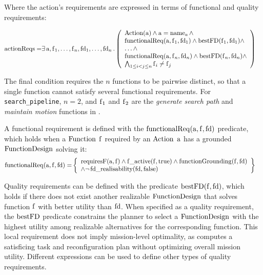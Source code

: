 Where the action's requirements are expressed in terms of functional and quality requirements:

\begin{align*}
    \operatorname{actionReqs} =& \exists \operatorname{a}, \operatorname{f}_1, \ldots{},\operatorname{f}_n,\operatorname{fd}_1,\ldots{},\operatorname{fd}_n .\left(\begin{array}{l} \operatorname{Action}(\operatorname{a}) \land \operatorname{a} = \operatorname{name}_a \land  \\
    \operatorname{functionalReq}(\operatorname{a}, \operatorname{f}_1, \operatorname{fd}_1) \land \operatorname{bestFD}(\operatorname{f}_1, \operatorname{fd}_1) \land
    \\ \ldots{} \land \\
    \operatorname{functionalReq}(\operatorname{a}, \operatorname{f}_n, \operatorname{fd}_n) \land \operatorname{bestFD}(\operatorname{f}_n, \operatorname{fd}_n) \land \\
    \bigwedge_{1 \leq i < j \leq n} \operatorname{f}_i \neq \operatorname{f}_j \\
 \end{array}\right)
\end{align*}

The final condition requires the $n$ functions to be pairwise distinct, so that a single function cannot satisfy several functional requirements. For \texttt{search\_pipeline}, $n = 2$, and $\operatorname{f}_1$ and $\operatorname{f}_2$ are the \emph{generate search path} and \emph{maintain motion} functions in .

A functional requirement is defined with the $\operatorname{functionalReq}(\operatorname{a}, \operatorname{f}, \operatorname{fd})$ predicate, which holds when a $\operatorname{Function}$ $\operatorname{f}$ required by an $\operatorname{Action}$ $\operatorname{a}$ has a grounded $\operatorname{FunctionDesign}$ solving it:
\begin{align*}
    \operatorname{functionalReq}(\operatorname{a}, \operatorname{f}, \operatorname{fd}) =& \left\lbrace\begin{array}{l}
    \operatorname{requiresF}(\operatorname{a}, \operatorname{f}) \land \operatorname{f\_active}(\operatorname{f}, \operatorname{true}) \land \operatorname{functionGrounding}(\operatorname{f}, \operatorname{fd}) \\
    \land \neg \operatorname{fd\_realisability}(\operatorname{fd}, \operatorname{false})
    \end{array}\right\rbrace
\end{align*}

Quality requirements can be defined with the predicate $\operatorname{bestFD}(\operatorname{f}, \operatorname{fd})$, which holds if there does not exist another realizable $\operatorname{FunctionDesign}$ that solves function $\operatorname{f}$ with better utility than $\operatorname{fd}$. When specified as a quality requirement, the $\operatorname{bestFD}$ predicate constrains the planner to select a $\operatorname{FunctionDesign}$ with the highest utility among realizable alternatives for the corresponding function. This local requirement does not imply mission-level optimality, as \planta computes a satisficing task and reconfiguration plan without optimizing overall mission utility. Different expressions can be used to define other types of quality requirements.

